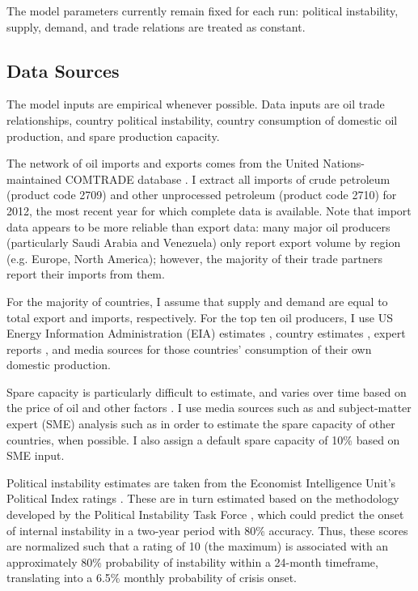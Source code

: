 \documentclass{llncs}
\begin{document}
The model parameters currently remain fixed for each run: political instability, supply, demand, and trade relations are treated as constant. 

\subsection{Data Sources}
The model inputs are empirical whenever possible. Data inputs are oil trade relationships, country political instability,  country consumption of domestic oil production, and spare production capacity.

The network of oil imports and exports comes from the United Nations-maintained COMTRADE database \cite{un_2013}. I extract all imports of crude petroleum (product code 2709) and other unprocessed petroleum (product code 2710) for 2012, the most recent year for which complete data is available. Note that import data appears to be more reliable than export data: many major oil producers (particularly Saudi Arabia and Venezuela) only report export volume by region (e.g. Europe, North America); however, the majority of their trade partners report their imports from them.

For the majority of countries, I assume that supply and demand are equal to total export and imports, respectively. For the top ten oil producers, I use US Energy Information Administration (EIA) estimates \cite{eia_2013}, country estimates \cite{canada_2009,eia_domestic}, expert reports \cite{mohamedi_2010}, and media sources \cite{rasmi_2013} for those countries' consumption of their own domestic production. 

Spare capacity is particularly difficult to estimate, and varies over time based on the price of oil and other factors \cite{mearns_2012}. I use media sources such as \cite{daya_2012} and subject-matter expert (SME) analysis such as \cite{mearns_2012} in order to estimate the spare capacity of other countries, when possible. I also assign a default spare capacity of 10\% based on SME input.

Political instability estimates are taken from the Economist Intelligence Unit's Political Index ratings \cite{eiu_2013}. These are in turn estimated based on the methodology developed by the Political Instability Task Force \cite{goldstone_2005}, which could predict the onset of internal instability in a two-year period with 80\% accuracy. Thus, these scores are normalized such that a rating of 10 (the maximum) is associated with an approximately 80\% probability of instability within a 24-month timeframe, translating into a 6.5\% monthly probability of crisis onset.
\end{document}
